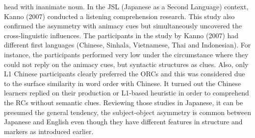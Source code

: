 \documentclass[
]{article}
\begin{document}
head with inanimate noun. In the JSL (Japanese as a Second Language)
context, Kanno (2007) conducted a listening comprehension research. This
study also confirmed the asymmetry with animacy cues but simultaneously
uncovered the cross-linguistic influences. The participants in the study
by Kanno (2007) had different first languages (Chinese, Sinhala,
Vietnamese, Thai and Indonesian). For instance, the participants
performed very low under the circumstance where they could not reply on
the animacy cues, but syntactic structures as clues. Also, only L1
Chinese participants clearly preferred the ORCs and this was considered
due to the surface similarity in word order with Chinese. It turned out
the Chinese learners replied on their production or L1-based heuristic
in order to comprehend the RCs without semantic clues. Reviewing those
studies in Japanese, it can be presumed the general tendency, the
subject-object asymmetry is common between Japanese and English even
though they have different features in structure and markers as
introduced earlier.
\end{document}
